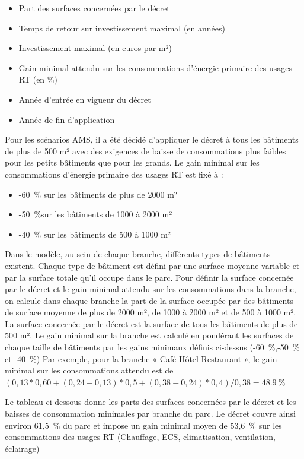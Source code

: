 \documentclass[10.5pt,a4paper]{article}
\begin{document}
{\begin{itemize}
	\item Part des surfaces concernées par le décret
	\item Temps de retour sur investissement maximal (en années)
	\item Investissement maximal (en euros par m²)
	\item Gain minimal attendu sur les consommations d’énergie primaire des usages RT (en \%)
	\item Année d’entrée en vigueur du décret
	\item Année de fin d’application
\end{itemize}

Pour les scénarios AMS, il a été décidé d’appliquer le décret à tous les bâtiments de plus de 500 m² avec des exigences de baisse de consommations plus faibles pour les petits bâtiments que pour les grands. Le gain minimal sur les consommations d’énergie primaire des usages RT est fixé à :

\begin{itemize}
	\item -60~\%	sur les bâtiments de plus de 2000 m²
	\item -50~\%sur les bâtiments de 1000 à 2000 m²
	\item -40~\% sur les bâtiments de 500 à 1000 m²
\end{itemize}

Dans le modèle, au sein de chaque branche, différents types de bâtiments existent. Chaque type de bâtiment est défini par une surface moyenne variable et par la surface totale qu’il occupe dans le parc. Pour définir la surface concernée par le décret et le gain minimal attendu sur les consommations dans la branche, on calcule dans chaque branche la part de la surface occupée par des bâtiments de surface moyenne de plus de 2000 m², de 1000 à 2000 m² et de 500 à 1000 m². La surface concernée par le décret est la surface de tous les bâtiments de plus de 500 m². Le gain minimal sur la branche est calculé en pondérant les surfaces de chaque taille de bâtiments par les gains minimaux définis ci-dessus (-60~\%,-50~\% et -40~\%)
Par exemple, pour la branche « Café Hôtel Restaurant », le gain minimal sur les consommations attendu est de $(0,13*0,60 + (0,24-0,13)*0,5 +(0,38-0,24)*0,4)/0,38 = 48.9~\% $

Le tableau ci-dessous donne les parts des surfaces concernées par le décret et les baisses de consommation minimales par branche du parc.
Le décret couvre ainsi environ 61,5~\% du parc et impose un gain minimal moyen de 53,6~\% sur les consommations des usages RT (Chauffage, ECS, climatisation, ventilation, éclairage)

}
\end{document}

